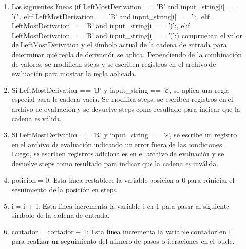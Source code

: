 \begin{enumerate}
\begin{enumerate}
    \item Las siguientes líneas (if LeftMostDerivation == 'B' and input\_string[i] == '(':, elif LeftMostDerivation == 'B' and input\_string[i] == '':, elif LeftMostDerivation == 'R' and input\_string[i] == ')':, elif LeftMostDerivation == 'R' and input\_string[i] == '(':) comprueban el valor de LeftMostDerivation y el símbolo actual de la cadena de entrada para determinar qué regla de derivación se aplica. Dependiendo de la combinación de valores, se modifican steps y se escriben registros en el archivo de evaluación para mostrar la regla aplicada.\newline
    
    \item Si LeftMostDerivation == 'B' y input\_string == 'ε', se aplica una regla especial para la cadena vacía. Se modifica steps, se escriben registros en el archivo de evaluación y se devuelve steps como resultado para indicar que la cadena es válida.\newline
    
    \item Si LeftMostDerivation == 'R' y input\_string == 'ε', se escribe un registro en el archivo de evaluación indicando un error fuera de las condiciones. Luego, se escriben registros adicionales en el archivo de evaluación y se devuelve steps como resultado para indicar que la cadena es inválida.\newline
    
    \item posicion = 0: Esta línea restablece la variable posicion a 0 para reiniciar el seguimiento de la posición en steps.\newline
    
    \item i = i + 1: Esta línea incrementa la variable i en 1 para pasar al siguiente símbolo de la cadena de entrada.\newline
    
    \item contador = contador + 1: Esta línea incrementa la variable contador en 1 para realizar un seguimiento del número de pasos o iteraciones en el bucle.\newline
    

\end{enumerate}
\end{enumerate}
